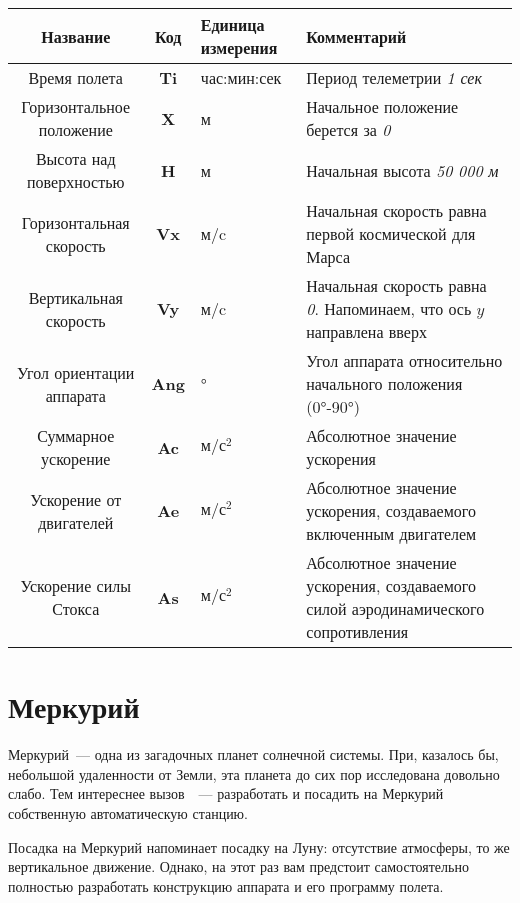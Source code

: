 \documentclass[12pt,a4paper]{article}
\begin{document}
\begin{center}
\begin{tabular}{ |c|c|p{2.5cm}|p{6cm}| } 
  \hline
  \textbf{Название} & \textbf{Код} & \textbf{Единица измерения} & \textbf{Комментарий} \\
  \hline
  Время полета & \textbf{Ti} & час:мин:сек & Период телеметрии \emph{1 сек}\\
  \hline
  Горизонтальное положение & \textbf{X} & м & Начальное положение берется за \emph{0}\\
  \hline
  Высота над поверхностью & \textbf{H} & м & Начальная высота \emph{50 000 м}\\
  \hline
  Горизонтальная скорость & \textbf{Vx} & м/c & Начальная скорость равна первой
  космической для Марса\\
  \hline
  Вертикальная скорость & \textbf{Vy} & м/c & Начальная скорость равна
  \emph{0}. Напоминаем, что ось $y$ направлена вверх\\
  \hline
  Угол ориентации аппарата & \textbf{Ang} & ° & Угол аппарата относительно начального положения (0°-90°)\\
  \hline
  Суммарное ускорение & \textbf{Ac} & $\text{м}/\text{с}^{2}$ & Абсолютное значение ускорения\\
  \hline
  Ускорение от двигателей & \textbf{Ae} & $\text{м}/\text{с}^{2}$ & Абсолютное значение ускорения,
  создаваемого включенным двигателем\\
  \hline
  Ускорение силы Стокса & \textbf{As} & $\text{м}/\text{с}^{2}$ & Абсолютное значение ускорения,
  создаваемого силой аэродинамического сопротивления\\
  \hline
\end{tabular}
\end{center}

\section{Меркурий}

Меркурий~--- одна из загадочных планет солнечной системы. При, казалось бы, небольшой
удаленности от Земли, эта планета до сих пор исследована довольно слабо. Тем интереснее
вызов~~--- разработать и посадить на Меркурий собственную автоматическую станцию.

Посадка на Меркурий напоминает посадку на Луну: отсутствие атмосферы, то же вертикальное
движение. Однако, на этот раз вам предстоит самостоятельно полностью разработать
конструкцию аппарата и его программу полета.
\end{document}
